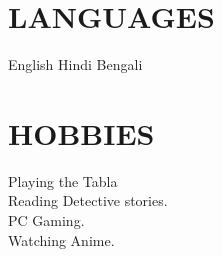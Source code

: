\documentclass[]{essdee-resume}
\begin{document}
\begin{minipage}[t]{0.33\textwidth}

\sectionsep

\section{LANGUAGES}
English \textbullet{} Hindi \textbullet{} Bengali \\
\sectionsep



\section{HOBBIES} 

\textbullet{} Playing the Tabla \\
\textbullet{} Reading Detective stories. \\
\textbullet{} PC Gaming. \\
\textbullet{} Watching Anime.

%
%

\end{minipage} 
\hfill
\end{document}
